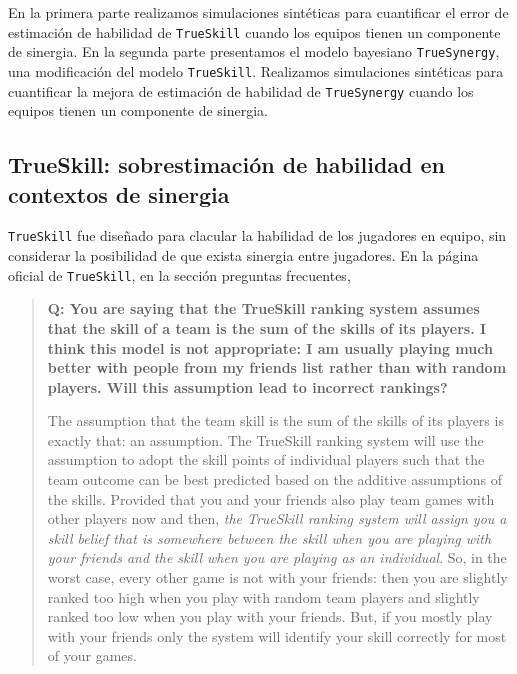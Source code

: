 \documentclass[a4paper,11pt]{book}
\theoremstyle{definition}
\begin{document}
\vspace{0.3cm}

En la primera parte realizamos simulaciones sint\'eticas para cuantificar el error de estimaci\'on de habilidad de \texttt{TrueSkill} cuando los equipos tienen un componente de sinergia.
En la segunda parte presentamos el modelo bayesiano \texttt{TrueSynergy}, una modificaci\'on del modelo \texttt{TrueSkill}.
Realizamos simulaciones sint\'eticas para cuantificar la mejora de estimaci\'on de habilidad de \texttt{TrueSynergy} cuando los equipos tienen un componente de sinergia.

\subsection{TrueSkill: sobrestimaci\'on de habilidad en contextos de sinergia} 

\texttt{TrueSkill} fue diseñado para clacular la habilidad de los jugadores en equipo, sin considerar la posibilidad de que exista sinergia entre jugadores.
En la p\'agina oficial de \texttt{TrueSkill}, en la secci\'on preguntas frecuentes,

\begin{quote}
 \footnotesize
 \textbf{Q: You are saying that the TrueSkill ranking system assumes that the skill of a team is the sum of the skills of its players. I think this model is not appropriate: I am usually playing much better with people from my friends list rather than with random players. Will this assumption lead to incorrect rankings?}

 \vspace{0.3cm}
 
 The assumption that the team skill is the sum of the skills of its players is exactly that: an assumption. The TrueSkill ranking system will use the assumption to adopt the skill points of individual players such that the team outcome can be best predicted based on the additive assumptions of the skills. Provided that you and your friends also play team games with other players now and then, \emph{the TrueSkill ranking system will assign you a skill belief that is somewhere between the skill when you are playing with your friends and the skill when you are playing as an individual}. So, in the worst case, every other game is not with your friends: then you are slightly ranked too high when you play with random team players and slightly ranked too low when you play with your friends. But, if you mostly play with your friends only the system will identify your skill correctly for most of your games.
\end{quote}
\end{document}
